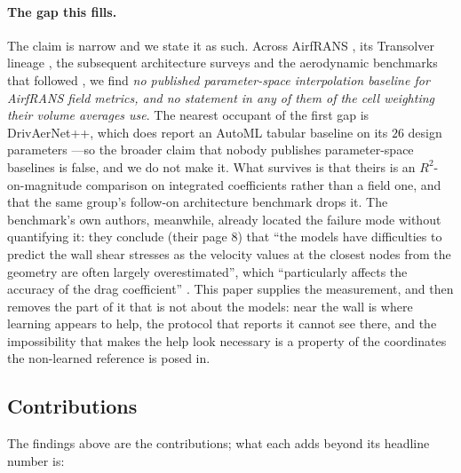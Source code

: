 \paragraph{The gap this fills.} The claim is narrow and we state it as such. Across
AirfRANS \citep{bonnet2022airfrans}, its Transolver lineage
\citep{wu2024transolver,luo2025transolverpp}, the subsequent architecture surveys
\citep{scherz2026evaluation,rigotti2026gist} and the aerodynamic benchmarks that followed
\citep{ahmedml2024,elrefaie2024drivaernet}, we find \emph{no published
parameter-space interpolation baseline for AirfRANS field metrics, and no statement in any
of them of the cell weighting their volume averages use}. The nearest occupant of the
first gap is DrivAerNet++, which does report an AutoML tabular baseline on its $26$ design
parameters \citep{elrefaie2024drivaernet}---so the broader claim that nobody publishes
parameter-space baselines is false, and we do not make it. What survives is that theirs is
an $R^2$-on-magnitude comparison on integrated coefficients rather than a field one, and
that the same group's follow-on architecture benchmark drops it. The benchmark's own
authors, meanwhile, already located the failure mode without quantifying it: they conclude
(their page 8) that ``the models have difficulties to predict the wall shear stresses as
the velocity values at the closest nodes from the geometry are often largely
overestimated'', which ``particularly affects the accuracy of the drag coefficient''
\citep{bonnet2022airfrans}. This paper supplies the measurement, and then removes the part
of it that is not about the models: near the wall is where learning appears to help, the
protocol that reports it cannot see there, and the impossibility that makes the help look
necessary is a property of the coordinates the non-learned reference is posed in.

\subsection{Contributions}

The findings above are the contributions; what each adds beyond its headline number is:


